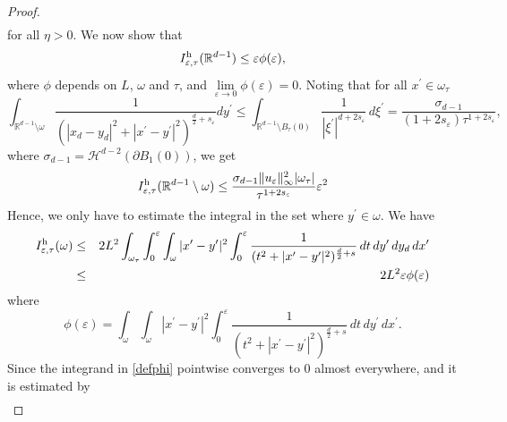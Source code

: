 \documentclass[11pt]{article}
\def\e{\varepsilon}
\begin{document}
\begin{proof}
\begin{eqnarray}
\end{eqnarray}
for all $\eta>0$. 
We now show that 
\begin{equation}\label{stima-or}
I_{\e,\tau}^{\rm h}(\mathbb R^{d-1})\leq\e\phi(\e),
\end{equation}
where $\phi$ depends on $L$, $\omega$ and $\tau$, and $\lim\limits_{\e\to 0}\phi(\e)=0$.
Noting that for all $x^\prime\in\omega_\tau$ 
\begin{equation*}
\int_{\mathbb R^{d-1}\setminus\omega} \frac{1}{(|x_d-y_d|^2+|x^\prime-y^\prime|^2)^{\frac{d}{2}+s_\e}} dy^\prime
\leq\int_{\mathbb R^{d-1}\setminus B_\tau(0)} \frac{1}{|\xi^\prime|^{d+2s_\e}}\, d\xi^\prime
=\frac{\sigma_{d-1}}{(1+2s_\e)\tau^{1+2s_\e}}, 
\end{equation*}
where $\sigma_{d-1}=\mathcal H^{d-2}(\partial B_1(0))$, 
we get 
\begin{equation}
I^{\rm h}_{\e,\tau}(\mathbb R^{d-1}\setminus \omega)
\leq \frac{\sigma_{d-1}\|u_\e\|^2_\infty |\omega_\tau|}{\tau^{1+2s_\e}}\e^2\label{st1}\\
\end{equation}
Hence, we only have to estimate the integral in the set where $y^\prime\in\omega$. 
We have 
\begin{eqnarray*}
I^{\rm h}_{\e,\tau}(\omega)
&\leq& 
2L^2\int_{\omega_\tau}\int_0^\e\int_{\omega}|x^\prime-y^\prime|^2\int_0^\e\frac{1}{(t^2+|x^\prime-y^\prime|^2)^{\frac{d}{2}+s}}\, dt\, dy^\prime\, dy_d\, dx^\prime\\
&\leq& 
2L^2\e\phi(\e)
\end{eqnarray*}
where 
\begin{equation}\label{defphi}\phi(\e)=
\int_{\omega}\int_{\omega}|x^\prime-y^\prime|^2
\int_0^\e\frac{1}{(t^2+|x^\prime-y^\prime|^2)^{\frac{d}{2}+s}}\, dt
\, dy^\prime\, dx^\prime.
\end{equation}
Since the integrand in \eqref{defphi} pointwise converges to $0$ almost everywhere, and it is estimated by 
\begin{eqnarray*}

\end{eqnarray*}
\end{proof}
\end{document}
